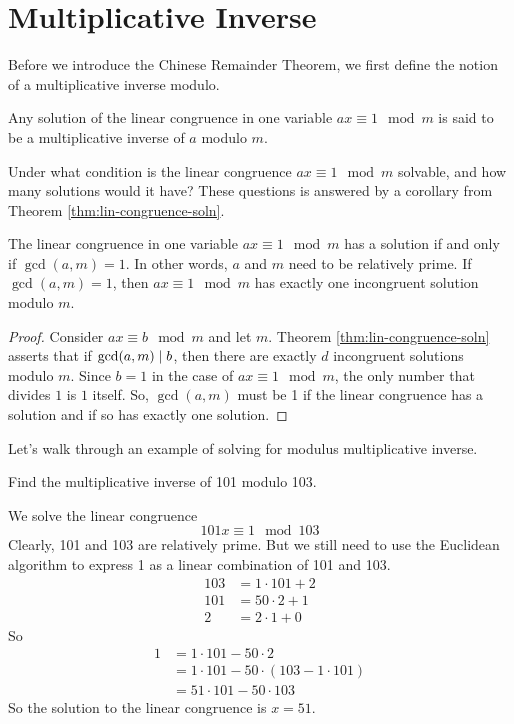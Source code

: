 \section{Multiplicative Inverse}

Before we introduce the Chinese Remainder Theorem, we first define the notion of a multiplicative inverse modulo.

\begin{definition}
    Any solution of the linear congruence in one variable $ax \equiv 1 \mod m$ is said to be a multiplicative inverse of $a$ modulo $m$.
\end{definition}

Under what condition is the linear congruence $ax \equiv 1 \mod m$ solvable, and how many solutions would it have? These questions is answered by a corollary from Theorem \ref{thm:lin-congruence-soln}.

\begin{corollary} \label{cor:mult-inverse-existence}
    The linear congruence in one variable $ax \equiv 1 \mod m$ has a solution if and only if $\gcd(a,m) = 1$. In other words, $a$ and $m$ need to be relatively prime. If $\gcd(a,m) = 1$, then $ax \equiv 1 \mod m$ has exactly one incongruent solution modulo $m$.
\end{corollary}

\begin{proof}
    Consider $ax \equiv b \mod m$ and let $m$. Theorem \ref{thm:lin-congruence-soln} asserts that if $\gcd(a,m) \mathrel{\mid} b$, then there are exactly $d$ incongruent solutions modulo $m$. Since $b = 1$ in the case of $ax \equiv 1 \mod m$, the only number that divides $1$ is $1$ itself. So, $\gcd(a,m)$ must be 1 if the linear congruence has a solution and if so has exactly one solution.
\end{proof}

Let's walk through an example of solving for modulus multiplicative inverse.

\begin{example}
    Find the multiplicative inverse of 101 modulo 103.
\end{example}
We solve the linear congruence
$$
101x \equiv 1 \mod 103
$$
Clearly, 101 and 103 are relatively prime. But we still need to use the Euclidean algorithm to express 1 as a linear combination of 101 and 103.
$$
\begin{aligned}
    103 &= 1 \cdot 101 + 2 \\
    101 &= 50 \cdot 2 + 1 \\
    2 &= 2 \cdot 1 + 0
\end{aligned}
$$
So 
$$
\begin{aligned}
    1 &= 1 \cdot 101 - 50 \cdot 2 \\
    &= 1 \cdot 101 - 50 \cdot (103 - 1 \cdot 101) \\
    &= 51 \cdot 101 - 50 \cdot 103
\end{aligned}
$$
So the solution to the linear congruence is $x = 51$.

